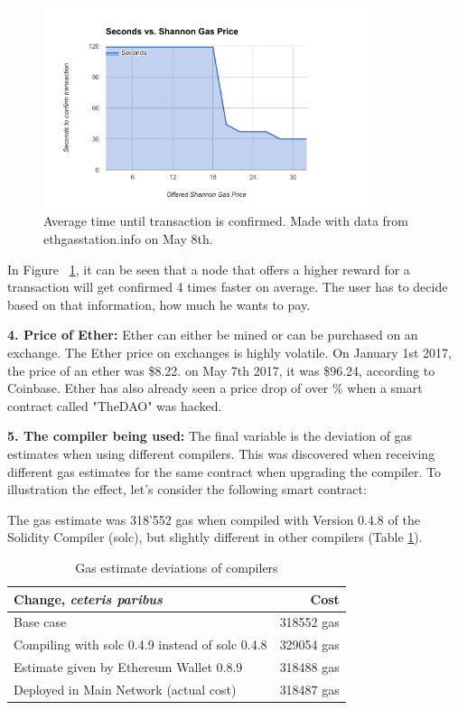 \begin{figure}[H]
\centering
\includegraphics[width=0.85\textwidth]{gas-vs-transaction-time.png}
\caption{Average time until transaction is confirmed. Made with data from ethgasstation.info on May 8th.}
\label{fig:gas}
\end{figure}

In Figure ~\ref{fig:gas}, it can be seen that a node that offers a higher reward for a transaction will get confirmed 4 times faster on average. The user has to decide based on that information, how much he wants to pay.

\textbf{4. Price of Ether:} Ether can either be mined or can be purchased on an exchange. The Ether price on exchanges is highly volatile. On January 1st 2017, the price of an ether was \$8.22. on May 7th 2017, it was \$96.24, according to Coinbase. Ether has also already seen a price drop of over \% when a smart contract called "TheDAO" was hacked.

\textbf{5. The compiler being used:} The final variable is the deviation of gas estimates when using different compilers. This was discovered when receiving different gas estimates for the same contract when upgrading the compiler. To illustration the effect, let's consider the following smart contract:



The gas estimate was 318'552 gas when compiled with Version 0.4.8 of the Solidity Compiler (solc), but slightly different in other compilers (Table \ref{table:GasDeviations}).

\begin{table}
  \begin{center}
      \begin{tabular}{ l | r }
        \hline
        \textbf{Change, \textit{ceteris paribus}} & \textbf{Cost} \\ \hline
        Base case & 318552 gas \\ \hline
        Compiling with solc 0.4.9 instead of solc 0.4.8 & 329054 gas \\ \hline
        Estimate given by Ethereum Wallet 0.8.9 & 318488 gas \\ \hline
        Deployed in Main Network (actual cost) & 318487 gas \\
        \hline
      \end{tabular}
      \caption{Gas estimate deviations of compilers}
      \label{table:GasDeviations}
  \end{center}
\end{table}

